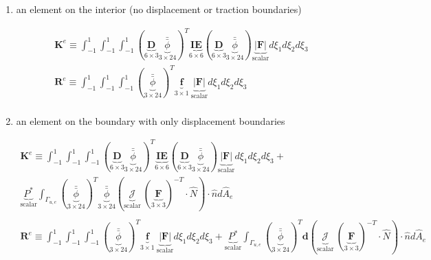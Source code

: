 \documentclass[10pt]{article}
\begin{document}
\begin{enumerate}
\item an element on the interior (no displacement or traction boundaries)

\begin{equation}
\begin{aligned}
\textbf{K}^e\equiv\int_{-1}^{1}\int_{-1}^{1}\int_{-1}^{1}(\underbrace{\textbf{D}}_{6\times3}\underbrace{\bar{\bar{\phi}}}_{3\times24})^T\underbrace{\textbf{IE}}_{6\times6}(\underbrace{\textbf{D}}_{6\times3}\underbrace{\bar{\bar{\phi}}}_{3\times24})\underbrace{|\textbf{F}|}_\text{scalar}d\xi_1d\xi_2d\xi_3\\
\textbf{R}^e\equiv\int_{-1}^{1}\int_{-1}^{1}\int_{-1}^{1}(\underbrace{\bar{\bar{\phi}}}_{3\times24})^T\underbrace{\textbf{f}}_{3\times1}\ \underbrace{|\textbf{F}|}_\text{scalar}d\xi_1d\xi_2d\xi_3\\
\end{aligned}
\end{equation}

\item an element on the boundary with only displacement boundaries

\begin{equation}
\begin{aligned}
\textbf{K}^e\equiv\int_{-1}^{1}\int_{-1}^{1}\int_{-1}^{1}(\underbrace{\textbf{D}}_{6\times3}\underbrace{\bar{\bar{\phi}}}_{3\times24})^T\underbrace{\textbf{IE}}_{6\times6}(\underbrace{\textbf{D}}_{6\times3}\underbrace{\bar{\bar{\phi}}}_{3\times24})\underbrace{|\textbf{F}|}_\text{scalar}d\xi_1d\xi_2d\xi_3 +\quad\\
\underbrace{P^{*}}_\text{scalar}\int_{\Gamma_{u,e}}(\underbrace{\bar{\bar{\phi}}}_{3\times24})^T\underbrace{\bar{\bar{\phi}}}_{3\times24}(\underbrace{\mathscr{J}}_\text{scalar}\ (\underbrace{\textbf{F}}_{3\times3})^{-T}\cdot\hat{N})\cdot\hat{n}d\hat{A}_e\\
\ \\
\textbf{R}^e\equiv\int_{-1}^{1}\int_{-1}^{1}\int_{-1}^{1}(\underbrace{\bar{\bar{\phi}}}_{3\times24})^T\underbrace{\textbf{f}}_{3\times1}\ \underbrace{|\textbf{F}|}_\text{scalar}d\xi_1d\xi_2d\xi_3+\underbrace{P^{*}}_\text{scalar}\int_{\Gamma_{u,e}}(\underbrace{\bar{\bar{\phi}}}_{3\times24})^T\textbf{d}(\underbrace{\mathscr{J}}_\text{scalar}\ (\underbrace{\textbf{F}}_{3\times3})^{-T}\cdot\hat{N})\cdot\hat{n}d\hat{A}_e\\
\end{aligned}
\end{equation}


\end{enumerate}
\end{document}
